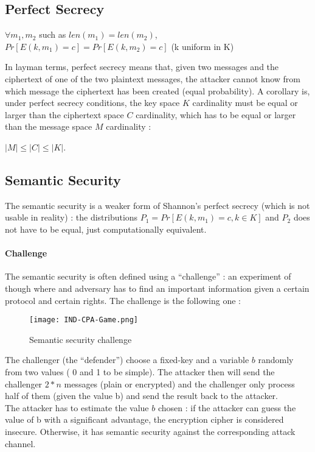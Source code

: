 \subsection{Perfect Secrecy}

\begin{mytheorem}
    $\forall m_1,m_2$ such as $len(m_1) = len(m_2)$, 
    $Pr[E(k,m_1) = c] = Pr[E(k,m_2) = c]$  \flushright (k uniform in K)
\end{mytheorem}

In layman terms, perfect secrecy means that, given two messages and the ciphertext of one of the two plaintext messages, the attacker cannot know from which message the ciphertext has been created (equal probability). A corollary is, under perfect secrecy conditions, the key space $K$ cardinality must be equal or larger than the ciphertext space $C$ cardinality, which has to be equal or larger than the message space $M$ cardinality :
\begin{mytheorem}
    $ |M| \leq |C| \leq |K| $. 
\end{mytheorem}


\subsection{Semantic Security}

The semantic security is a weaker form of Shannon's perfect secrecy (which is not usable in reality) : the distributions $P_1 = Pr[E(k,m_1) = c , k\in K]$ and $P_2$ does not have to be equal, just computationally equivalent.

\paragraph{Challenge}
The semantic security is often defined using a ``challenge'' : an experiment of though where and adversary has to find an important information given a certain protocol and certain rights. The challenge is the following one :

\begin{figure}[ht!]
	\centering
		\texttt{[image: IND-CPA-Game.png]}
	\caption{Semantic security challenge}
	\label{fig:SemanticSecurityChallenge}
\end{figure}

The challenger (the ``defender'') choose a fixed-key and a variable $b$ randomly from two values ( 0 and 1 to be simple). The attacker then will send the challenger $2*n$ messages (plain or encrypted) and the challenger only process half of them (given the value b) and send the result back to the attacker.\\
The attacker has to estimate the value $b$ chosen : if the attacker can guess the value of b with a significant advantage, the encryption cipher is considered insecure. Otherwise, it has semantic security against the corresponding attack channel.


